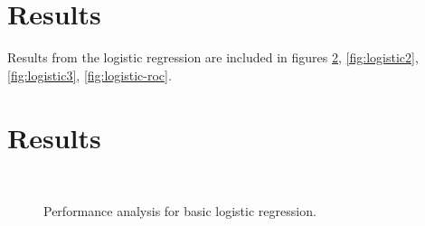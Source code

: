 \section{Results}
Results from the logistic regression are included in figures 
\ref{fig:logistic1}, \ref{fig:logistic2}, \ref{fig:logistic3}, 
\ref{fig:logistic-roc}.


\section{Results}\label{fig:logistic1}
\begin{figure}[H]
\begin{center}
     \\
\end{center}
\caption[caption]{Performance analysis for basic logistic regression.}
\end{figure}
